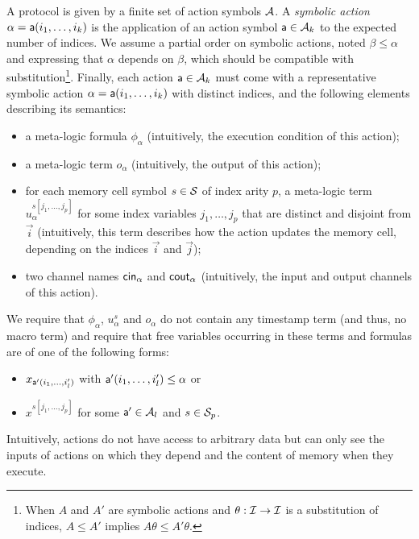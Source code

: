 \begin{definition} \label{def:action} \label{def:proto}
  A protocol is given by a finite set of action symbols $\mathcal{A}$.
  A \emph{symbolic action} $\alpha = \textsf{a}(i_1,\ldots,i_k)$
  is the application of an action symbol $\textsf{a} \in \mathcal{A}_k$
  to the expected  number of indices.
  We assume a partial order on symbolic actions,
  noted $\beta \leq \alpha$ and expressing that $\alpha$ depends on $\beta$,
  which should be compatible with substitution\footnote{
    When $A$ and $A'$ are symbolic actions and $\theta : \mathcal{I} \to \mathcal{I}$
    is a substitution of indices,
    $A \leq A'$ implies $A\theta \leq A'\theta$.
  }.
  Finally, each action $\textsf{a} \in \mathcal{A}_k$ must come with
  a representative symbolic action $\alpha = \textsf{a}(i_1,\ldots,i_k)$
  with distinct indices,
  and the following elements describing its semantics:
  \begin{itemize}
    \item a meta-logic formula $\phi_{\alpha}$
      (intuitively, the execution condition of this action);
    \item a meta-logic term $o_{\alpha}$
      (intuitively, the output of this action);
    \item for each memory cell symbol $s \in \mathcal{S}$ of index arity $p$,
      a meta-logic term $u_{\alpha}^{s[j_1,\ldots,j_p]}$
      for some index variables $j_1,\ldots,j_p$
      that are distinct and disjoint from $\vec{i}$
      (intuitively, this term describes how the action updates the memory
      cell, depending on the indices $\vec{i}$ and $\vec{j}$);
    \item two channel names $\mathsf{cin}_\alpha$ and $\mathsf{cout}_\alpha$
      (intuitively, the input and output channels of this action).
  \end{itemize}
  We require that
  $\phi_{\alpha}$, $u_{\alpha}^{s}$ and $o_{\alpha}$ do not contain any
  timestamp term (and thus, no macro term) and require that
  free variables occurring in these terms and formulas are
  of one of the following forms:
  \begin{itemize}
    \item $x_{\textsf{a}'(i_1,\ldots,i'_l)}$
      with $\textsf{a}'(i_1,\ldots,i'_l)\leq \alpha$ or
    \item $x^{s[j_1,\ldots,j_p]}$
      for some $\textsf{a}' \in \mathcal{A}_l$ and $s \in \mathcal{S}_p$.
  \end{itemize}
  Intuitively, actions do not have access to arbitrary data but can only
  see the inputs of actions on which they depend
  and the content of memory when they execute.
\end{definition}


